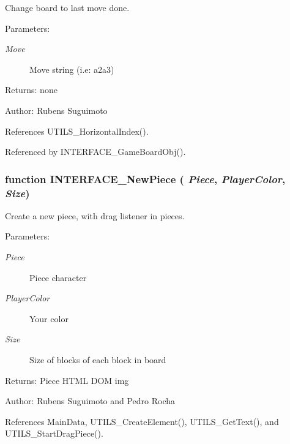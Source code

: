 Change board to last move done. 

\begin{Desc}
\item[Parameters:]
\begin{description}
\item[{\em Move}]Move string (i.e: a2a3) \end{description}
\end{Desc}
\begin{Desc}
\item[Returns:]none \end{Desc}
\begin{Desc}
\item[Author:]Rubens Suguimoto \end{Desc}


References UTILS\_\-HorizontalIndex().

Referenced by INTERFACE\_\-GameBoardObj().
\subsubsection[INTERFACE\_\-NewPiece]{\setlength{\rightskip}{0pt plus 5cm}function INTERFACE\_\-NewPiece ( {\em Piece}, \/   {\em PlayerColor}, \/   {\em Size})}\label{board_8js_36d68b299621ca3eddd5bd87d3784029}


Create a new piece, with drag listener in pieces. 

\begin{Desc}
\item[Parameters:]
\begin{description}
\item[{\em Piece}]Piece character \item[{\em PlayerColor}]Your color \item[{\em Size}]Size of blocks of each block in board \end{description}
\end{Desc}
\begin{Desc}
\item[Returns:]Piece HTML DOM img \end{Desc}
\begin{Desc}
\item[Author:]Rubens Suguimoto and Pedro Rocha \end{Desc}


References MainData, UTILS\_\-CreateElement(), UTILS\_\-GetText(), and UTILS\_\-StartDragPiece().

